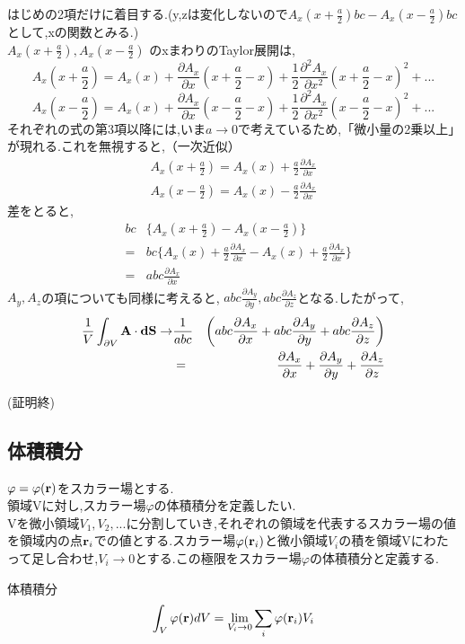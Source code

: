 \documentclass{jsarticle}
\begin{document}
はじめの2項だけに着目する.(y,zは変化しないので$A_x(x+\frac{a}{2})bc-A_x(x-\frac{a}{2})bc$として,xの関数とみる.)\\
$A_x(x+\frac{a}{2}),A_x(x-\frac{a}{2})$ のxまわりのTaylor展開は,\\
\begin{equation}
A_x(x+\frac{a}{2})=A_x(x)+\frac{\partial A_x}{\partial x}(x+\frac{a}{2}-x)+\frac{1}{2}\frac{\partial^2 A_x}{\partial x^2}(x+\frac{a}{2}-x)^2+...
\end{equation}
\begin{equation}
A_x(x-\frac{a}{2})=A_x(x)+\frac{\partial A_x}{\partial x}(x-\frac{a}{2}-x)+\frac{1}{2}\frac{\partial^2 A_x}{\partial x^2}(x-\frac{a}{2}-x)^2+...
\end{equation}
それぞれの式の第3項以降には,いま$a \to 0$で考えているため,「微小量の2乗以上」が現れる.これを無視すると,（一次近似）
\begin{eqnarray}
A_x(x+\frac{a}{2})=A_x(x)+\frac{a}{2}\frac{\partial A_x}{\partial x}\\
A_x(x-\frac{a}{2})=A_x(x)-\frac{a}{2}\frac{\partial A_x}{\partial x}
\end{eqnarray}
差をとると,
\begin{eqnarray}
&bc&\{A_x(x+\frac{a}{2})-A_x(x-\frac{a}{2})\}\\
&=&bc\{ A_x(x)+\frac{a}{2}\frac{\partial A_x}{\partial x}-A_x(x)+\frac{a}{2}\frac{\partial A_x}{\partial x} \} \\
&=&abc\frac{\partial A_x}{\partial x}
\end{eqnarray}
$A_y,A_z$の項についても同様に考えると, $ abc\frac{\partial A_y}{\partial y},abc\frac{\partial A_z}{\partial z} $となる.したがって,
\begin{eqnarray}
\frac{1}{V}\int_{\partial V}^{}{\bf A}\cdot {\bf dS} \to &\frac{1}{abc}&\left(abc\frac{\partial A_x}{\partial x}+abc\frac{\partial A_y}{\partial y}+abc\frac{\partial A_z}{\partial z} \right)\\
&=&\frac{\partial A_x}{\partial x}+\frac{\partial A_y}{\partial y}+\frac{\partial A_z}{\partial z}
\end{eqnarray}
\begin{flushright}
(証明終)
\end{flushright}

\subsection{体積積分}
$\varphi=\varphi({\bf r})$をスカラー場とする.\\
領域Vに対し,スカラー場$\varphi$の体積積分を定義したい.\\
Vを微小領域$V_1,V_2,...$に分割していき,それぞれの領域を代表するスカラー場の値を領域内の点${\bf r}_i$での値とする.スカラー場$\varphi({\bf r}_i)$と微小領域$V_i$の積を領域Vにわたって足し合わせ,$V_i \to 0$とする.この極限をスカラー場$\varphi$の体積積分と定義する.
\begin{itembox}[c]{体積積分}
\begin{equation}
\int_{V}^{}\varphi({\bf r})dV = \lim_{V_i \to 0}\sum_{i}^{}\varphi({\bf r}_i)V_i
\end{equation}
\end{itembox}
\end{document}
